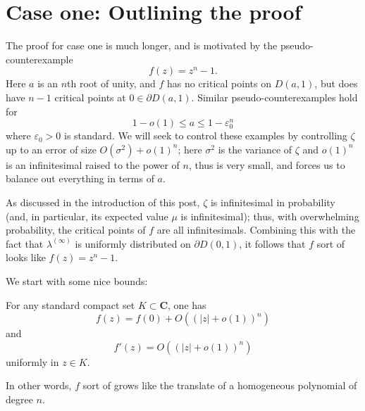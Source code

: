 \documentclass[12pt]{article}
\begin{document}
\section{Case one: Outlining the proof}
The proof for case one is much longer, and is motivated by the pseudo-counterexample
$$f(z) = z^n - 1.$$
Here $a$ is an $n$th root of unity, and $f$ has no critical points on $D(a, 1)$, but does have $n - 1$ critical points at $0 \in \partial D(a, 1)$.
Similar pseudo-counterexamples hold for
$$1 - o(1) \leq a \leq 1 - \varepsilon_0^n$$
where $\varepsilon_0 > 0$ is standard. We will seek to control these examples by controlling $\zeta$ up to an error of size $O(\sigma^2) + o(1)^n$; here $\sigma^2$ is the variance of $\zeta$ and $o(1)^n$ is an infinitesimal raised to the power of $n$, thus is very small, and forces us to balance out everything in terms of $a$.

As discussed in the introduction of this post, $\zeta$ is infinitesimal in probability (and, in particular, its expected value $\mu$ is infinitesimal); thus, with overwhelming probability, the critical points of $f$ are all infinitesimals.
Combining this with the fact that $\lambda^{(\infty)}$ is uniformly distributed on $\partial D(0, 1)$, it follows that $f$ sort of looks like $f(z) = z^n - 1$.

We start with some nice bounds:
\begin{lemma}
For any standard compact set $K \subset \mathbf C$, one has
$$f(z) = f(0) + O((|z| + o(1))^n)$$
and
$$f'(z) = O((|z| + o(1))^n)$$
uniformly in $z \in K$.
\end{lemma}
In other words, $f$ sort of grows like the translate of a homogeneous polynomial of degree $n$.
\end{document}
